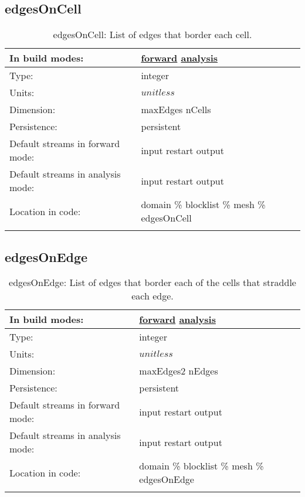 \subsection[edgesOnCell]{edgesOnCell}
\label{subsec:var_sec_mesh_edgesOnCell}
\begin{center}
\begin{longtable}{| p{2.0in} | p{4.0in} |}
        \hline 
        In build modes: & \hyperref[subsec:forward_var_tab_mesh]{forward} \hyperref[subsec:analysis_var_tab_mesh]{analysis} \\
        \hline 
        Type: & integer \\
        \hline 
        Units: & $unitless$ \\
        \hline 
        Dimension: & maxEdges nCells \\
        \hline 
        Persistence: & persistent \\
        \hline 
		 Default streams in forward mode: &  input restart output \\
        \hline 
		 Default streams in analysis mode: &  input restart output \\
        \hline 
		 Location in code: & domain \% blocklist \% mesh \% edgesOnCell \\
		 \hline 
    \caption{edgesOnCell: List of edges that border each cell.}
\end{longtable}
\end{center}
\subsection[edgesOnEdge]{edgesOnEdge}
\label{subsec:var_sec_mesh_edgesOnEdge}
\begin{center}
\begin{longtable}{| p{2.0in} | p{4.0in} |}
        \hline 
        In build modes: & \hyperref[subsec:forward_var_tab_mesh]{forward} \hyperref[subsec:analysis_var_tab_mesh]{analysis} \\
        \hline 
        Type: & integer \\
        \hline 
        Units: & $unitless$ \\
        \hline 
        Dimension: & maxEdges2 nEdges \\
        \hline 
        Persistence: & persistent \\
        \hline 
		 Default streams in forward mode: &  input restart output \\
        \hline 
		 Default streams in analysis mode: &  input restart output \\
        \hline 
		 Location in code: & domain \% blocklist \% mesh \% edgesOnEdge \\
		 \hline 
    \caption{edgesOnEdge: List of edges that border each of the cells that straddle each edge.}
\end{longtable}
\end{center}
